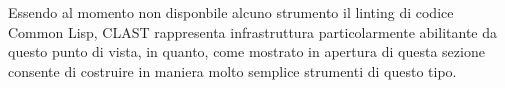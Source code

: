 %
%
%

Essendo al momento non disponbile alcuno strumento il linting di codice Common
Lisp, CLAST rappresenta infrastruttura particolarmente abilitante da questo
punto di vista, in quanto, come mostrato in apertura di questa sezione consente
di costruire in maniera molto semplice strumenti di questo tipo.

